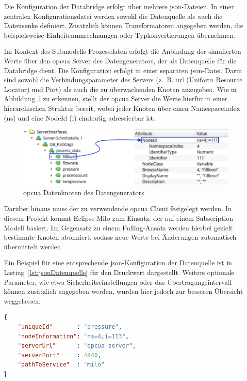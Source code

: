 Die Konfiguration der Databridge erfolgt über mehrere \acs{json}-Dateien.
In einer zentralen Konfigurationsdatei werden sowohl die Datenquelle als auch die Datensenke definiert.
Zusätzlich können Transformatoren angegeben werden, die beispielsweise Einheitenumrechnungen oder Typkonvertierungen übernehmen.

Im Kontext des Submodells Prozessdaten erfolgt die Anbindung der simulierten Werte über den \acs{opcua} Server des Datengenerators, der als Datenquelle für die Databridge dient.
Die Konfiguration erfolgt in einer separaten \acs{json}-Datei.
Darin sind sowohl die Verbindungsparameter des Servers (z.~B. \acs{url} (Uniform Resource Locator) und Port) als auch die zu überwachenden Knoten anzugeben.
Wie in Abbildung \ref{fig:OPCUADatenStruktur} zu erkennen, stellt der \acs{opcua} Server die Werte hierfür in einer hierarchischen Struktur bereit, wobei jeder Knoten über einen Namespaceindex (ns) und eine NodeId (i) eindeutig adressierbar ist.

\newpage
\begin{figure}[htbp]
    \centering
    \includegraphics{Bilder/OPCUA/OPCUADaten.pdf}
    \caption[\acs{opcua} Datenknoten des Datengenerators]{\acs{opcua} Datenknoten des Datengenerators}
    \label{fig:OPCUADatenStruktur}
\end{figure}

Darüber hinaus muss der zu verwendende \acs{opcua} Client festgelegt werden.
In diesem Projekt kommt Eclipse Milo zum Einsatz, der auf einem Subscription-Modell basiert.
Im Gegensatz zu einem Polling-Ansatz werden hierbei gezielt bestimmte Knoten abonniert, sodass neue Werte bei Änderungen automatisch übermittelt werden.

Ein Beispiel für eine entsprechende \acs{json}-Konfiguration der Datenquelle ist in Listing~\ref{lst:jsonDatenquelle} für den Druckwert dargestellt.
Weitere optionale Parameter, wie etwa Sicherheitseinstellungen oder das Übertragungsintervall können zusätzlich angegeben werden, wurden hier jedoch zur besseren Übersicht weggelassen.

\begin{lstlisting}[language=json, caption={Beispielhafte \acs{json}-Konfiguration einer Datenquelle}, label={lst:jsonDatenquelle}]
{
    "uniqueId"       : "pressure",
    "nodeInformation": "ns=4;i=113",
    "serverUrl"      : "opcua-server",
    "serverPort"     : 4840,
    "pathToService"  : "milo"
}
\end{lstlisting}

